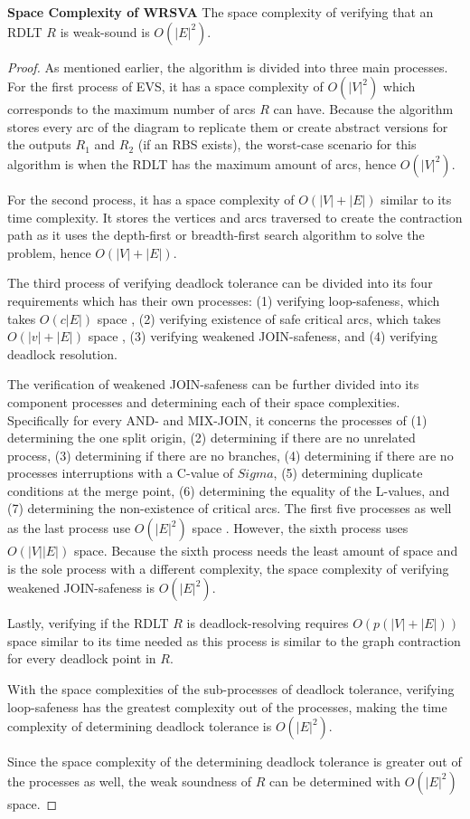 \begin{thm}\textbf{Space Complexity of WRSVA}
    The space complexity of verifying that an RDLT $ R $ is weak-sound is $ O(|E|^2) $.
    \label{SCWRSVA}
\end{thm}
\begin{proof}
    As mentioned earlier, the algorithm is divided into three main processes. For the first process of EVS, it has a space complexity of $ O(|V|^2)$ which corresponds to the maximum number of arcs $ R $ can have. Because the algorithm stores every arc of the diagram to replicate them or create abstract versions for the outputs $ R_1 $ and $ R_2 $ (if an RBS exists), the worst-case scenario for this algorithm is when the RDLT has the maximum amount of arcs, hence $ O(|V|^2) $. 
    
    For the second process, it has a space complexity of $ O(|V|+|E|)$ similar to its time complexity. It stores the vertices and arcs traversed to create the contraction path as it uses the depth-first or breadth-first search algorithm to solve the problem, hence $ O(|V|+|E|) $.

    The third process of verifying deadlock tolerance can be divided into its four requirements which has their own processes: (1) verifying loop-safeness, which takes $ O(c|E|) $ space \cite{MalinaoPJS2023}, (2) verifying existence of safe critical arcs, which takes $ O(|v|+|E|) $ space \cite{MalinaoPJS2023}, (3) verifying weakened JOIN-safeness, and (4) verifying deadlock resolution.
    
    The verification of weakened JOIN-safeness can be further divided into its component processes and determining each of their space complexities. Specifically for every AND- and MIX-JOIN, it concerns the processes of (1) determining the one split origin, (2) determining if there are no unrelated process, (3) determining if there are no branches, (4) determining if there are no processes interruptions with a C-value of $ Sigma $, (5) determining duplicate conditions at the merge point, (6) determining the equality of the L-values, and (7) determining the non-existence of critical arcs. The first five processes as well as the last process use $ O(|E|^2) $ space \cite{MalinaoPJS2023}. However, the sixth process uses $ O(|V||E|) $ space. Because the sixth process needs the least amount of space and is the sole process with a different complexity, the space complexity of verifying weakened JOIN-safeness is $ O(|E|^2) $.

    Lastly, verifying if the RDLT $ R $ is deadlock-resolving requires $ O(p(|V| + |E|)) $ space similar to its time needed as this process is similar to the graph contraction for every deadlock point in $ R $.
    
    With the space complexities of the sub-processes of deadlock tolerance, verifying loop-safeness has the greatest complexity out of the processes, making the time complexity of determining deadlock tolerance is $ O(|E|^2) $.

    Since the space complexity of the determining deadlock tolerance is greater out of the processes as well, the weak soundness of $ R $ can be determined with $ O(|E|^2) $ space.
\end{proof}

